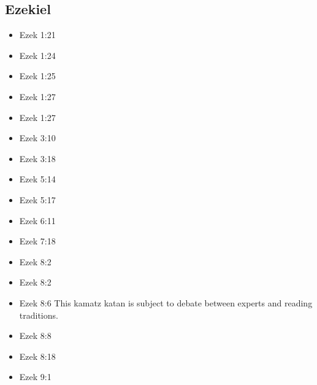 \documentclass[14pt]{book}
\begin{document}
						\subsection{Ezekiel}
					\begin{multicols}{2}\begin{itemize}
								
								\item Ezek 1:21
								
								\item Ezek 1:24
								
								\item Ezek 1:25
								
								\item Ezek 1:27
								
								\item Ezek 1:27
								
								\item Ezek 3:10
								
								\item Ezek 3:18
								
								\item Ezek 5:14
								
								\item Ezek 5:17
								
								\item Ezek 6:11
								
								\item Ezek 7:18
								
								\item Ezek 8:2
								
								\item Ezek 8:2
								
								\item Ezek 8:6 This kamatz katan is subject to debate between experts and reading traditions.
								
								\item Ezek 8:8
								
								\item Ezek 8:18
								
								\item Ezek 9:1
								

\end{itemize}
\end{multicols}
\end{document}
